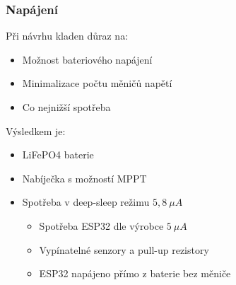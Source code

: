 \documentclass[%
  12pt,       				%
	t,                  %
	aspectratio=1610,   %
	unicode,						%
]{beamer}				    	%
\begin{document}
\begin{frame}
	\frametitle{Napájení}

	\vspace{1ex}
	Při návrhu kladen důraz na:
	\begin{itemize}
		\item Možnost bateriového napájení
		\item Minimalizace počtu měničů napětí
		\item Co nejnižší spotřeba
	\end{itemize}

	\vspace{1.5ex}
	Výsledkem je:
	\begin{itemize}
		\item LiFePO4 baterie
		\item Nabíječka s možností MPPT
		\item Spotřeba v deep-sleep režimu $5,8~\mu A$
		\begin{itemize}
			\item Spotřeba ESP32 dle výrobce $5~\mu A$
			\item Vypínatelné senzory a pull-up rezistory
			\item ESP32 napájeno přímo z baterie bez měniče
		\end{itemize}
	\end{itemize}


\end{frame}

\end{document}
